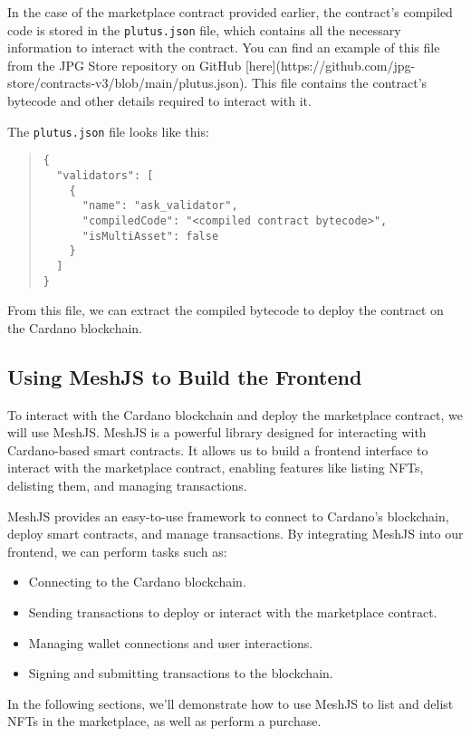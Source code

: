 In the case of the marketplace contract provided earlier, the contract's compiled code is stored in the \texttt{plutus.json} file, which contains all the necessary information to interact with the contract. You can find an example of this file from the JPG Store repository on GitHub [here](https://github.com/jpg-store/contracts-v3/blob/main/plutus.json). This file contains the contract's bytecode and other details required to interact with it.

The \texttt{plutus.json} file looks like this:
\begin{quote}
\begin{verbatim}
{
  "validators": [
    {
      "name": "ask_validator",
      "compiledCode": "<compiled contract bytecode>",
      "isMultiAsset": false
    }
  ]
}
\end{verbatim}
\end{quote}

From this file, we can extract the compiled bytecode to deploy the contract on the Cardano blockchain.

\subsection{Using MeshJS to Build the Frontend}

To interact with the Cardano blockchain and deploy the marketplace contract, we will use MeshJS. MeshJS is a powerful library designed for interacting with Cardano-based smart contracts. It allows us to build a frontend interface to interact with the marketplace contract, enabling features like listing NFTs, delisting them, and managing transactions.

MeshJS provides an easy-to-use framework to connect to Cardano’s blockchain, deploy smart contracts, and manage transactions. By integrating MeshJS into our frontend, we can perform tasks such as:

\begin{itemize}
    \item Connecting to the Cardano blockchain.
    \item Sending transactions to deploy or interact with the marketplace contract.
    \item Managing wallet connections and user interactions.
    \item Signing and submitting transactions to the blockchain.
\end{itemize}

In the following sections, we’ll demonstrate how to use MeshJS to list and delist NFTs in the marketplace, as well as perform a purchase.

